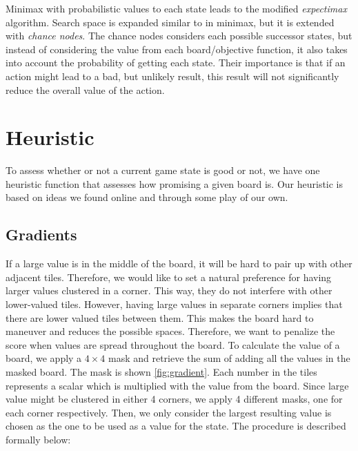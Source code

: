 \documentclass[journal]{IEEEtran}
\begin{document}
Minimax with probabilistic values to each state leads to the modified \textit{expectimax} algorithm.
Search space is expanded similar to in minimax, but it is extended with 
\textit{chance nodes}.  The chance nodes considers each possible successor states, but instead
of considering the value from each board/objective function, it also takes into account 
the probability of getting each state.
Their importance is that if an action might lead to a bad, but unlikely result,
this result will not significantly reduce the overall value of the action.

\section*{Heuristic}

To assess whether or not a current game state is good or not, we have one
heuristic function that assesses how promising a given board is. 
Our heuristic is based on ideas we found online and through some play of our
own.

\subsection*{Gradients}
If a large value is in the middle of the board, it will be hard to pair up
with other adjacent tiles. Therefore, we would like to set a natural preference
for having larger values clustered in a corner. This way, they do not interfere
with other lower-valued tiles. However, having large values
in separate corners implies that there are lower valued tiles between them.
This makes the board hard to maneuver and reduces the possible spaces.
Therefore, we want to penalize the score when values are spread throughout the
board. \newline
\indent To calculate the value of a board, we apply a $4\times{}4$ mask and retrieve the
sum of adding all the values in the masked board.
The mask is shown \autoref{fig:gradient}. Each number in the tiles represents a
scalar which is multiplied with the value from the board. Since large value
might be clustered in either 4 corners, we apply 4 different masks, one for
each corner respectively.  Then, we only consider the largest resulting value
is chosen as the one to be used as a value for the state. The procedure is
described formally below:
\end{document}
